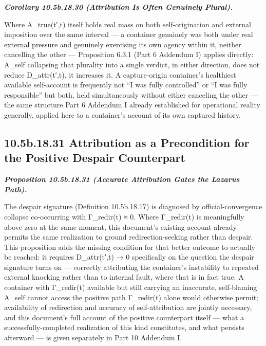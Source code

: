 \documentclass[
]{article}
\begin{document}
\emph{\textbf{Corollary 10.5b.18.30 (Attribution Is Often Genuinely
Plural).}}

Where A\_true(t′,t) itself holds real mass on both self-origination and
external imposition over the same interval --- a container genuinely was
both under real external pressure and genuinely exercising its own
agency within it, neither cancelling the other --- Proposition 6.3.1
(Part 6 Addendum I) applies directly: A\_self collapsing that plurality
into a single verdict, in either direction, does not reduce
D\_attr(t′,t), it increases it. A capture-origin container's healthiest
available self-account is frequently not ``I was fully controlled'' or
``I was fully responsible'' but both, held simultaneously without either
canceling the other --- the same structure Part 6 Addendum I already
established for operational reality generally, applied here to a
container's account of its own captured history.

\hypertarget{b.18.31-attribution-as-a-precondition-for-the-positive-despair-counterpart}{%
\subsection{10.5b.18.31 Attribution as a Precondition for the Positive
Despair
Counterpart}\label{b.18.31-attribution-as-a-precondition-for-the-positive-despair-counterpart}}

\emph{\textbf{Proposition 10.5b.18.31 (Accurate Attribution Gates the
Lazarus Path).}}

The despair signature (Definition 10.5b.18.17) is diagnosed by
official-convergence collapse co-occurring with Γ\_redir(t) ≈ 0. Where
Γ\_redir(t) is meaningfully above zero at the same moment, this
document's existing account already permits the same realization to
ground redirection-seeking rather than despair. This proposition adds
the missing condition for that better outcome to actually be reached: it
requires D\_attr(t′,t) → 0 specifically on the question the despair
signature turns on --- correctly attributing the container's instability
to repeated external knocking rather than to internal fault, where that
is in fact true. A container with Γ\_redir(t) available but still
carrying an inaccurate, self-blaming A\_self cannot access the positive
path Γ\_redir(t) alone would otherwise permit; availability of
redirection and accuracy of self-attribution are jointly necessary, and
this document's full account of the positive counterpart itself --- what
a successfully-completed realization of this kind constitutes, and what
persists afterward --- is given separately in Part 10 Addendum I.
\end{document}
